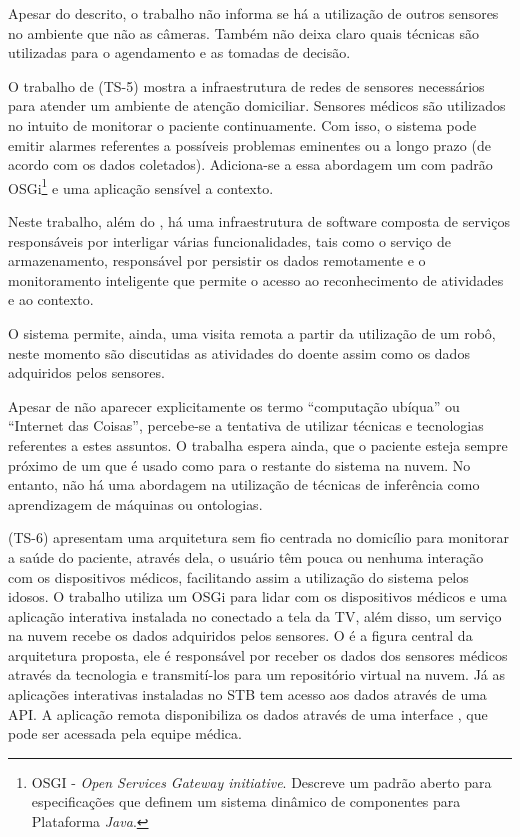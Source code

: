 Apesar do descrito, o trabalho não informa se há a utilização de outros
sensores no ambiente que não as câmeras. Também não deixa claro quais
técnicas são utilizadas para o agendamento e as tomadas de decisão.

O trabalho de  (TS-5) mostra a infraestrutura de redes
de sensores necessários para atender um ambiente de atenção domiciliar.
Sensores médicos são utilizados no intuito de monitorar o paciente
continuamente. Com isso, o sistema pode emitir alarmes referentes a possíveis
problemas eminentes ou a longo prazo (de acordo com os dados coletados).
Adiciona-se a essa abordagem um \middleware[] com padrão OSGi\footnote{OSGI -
\textit{Open Services Gateway initiative}. Descreve um padrão aberto para
especificações que definem um sistema dinâmico de componentes para Plataforma
\textit{Java}.} e uma aplicação sensível a contexto.

Neste trabalho, além do \middleware, há uma infraestrutura de software composta
de serviços responsáveis por interligar várias funcionalidades, tais como o
serviço de armazenamento, responsável por persistir os dados remotamente e o
monitoramento inteligente que permite o acesso ao reconhecimento de atividades
e ao contexto.  

O sistema permite, ainda, uma visita remota a partir da utilização de um robô,
neste momento são discutidas as atividades do doente assim como os dados
adquiridos pelos sensores.

Apesar de não aparecer explicitamente os termo ``computação ubíqua'' ou ``Internet
das Coisas'', percebe-se a tentativa de utilizar técnicas e tecnologias referentes a
estes assuntos. O trabalha espera ainda, que o paciente esteja sempre próximo
de um \smartphone[] que é usado como \gateway[] para o restante do sistema na nuvem.
No entanto, não há uma abordagem na utilização de técnicas de inferência como
aprendizagem de máquinas ou ontologias.

 (TS-6) apresentam uma arquitetura sem fio centrada no
domicílio para monitorar a saúde do paciente, através dela, o usuário têm pouca
ou nenhuma interação com os dispositivos médicos, facilitando assim a
utilização do sistema pelos idosos. O trabalho utiliza um \framework[] OSGi para
lidar com os dispositivos médicos e uma aplicação interativa instalada no
\stb[] conectado a tela da TV, além disso, um serviço na nuvem recebe os
dados adquiridos pelos sensores. O \gateway[] é a figura central da arquitetura
proposta, ele é responsável por receber os dados dos sensores médicos através
da tecnologia \bluetooth[] e transmití-los para um repositório virtual na nuvem.
Já as aplicações interativas instaladas no STB tem acesso aos dados através de
uma API. A aplicação remota disponibiliza os dados através de uma interface
\web, que pode ser acessada pela equipe médica.

